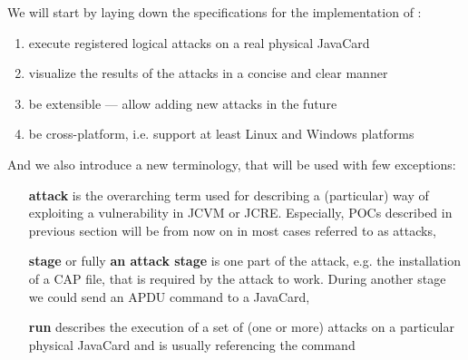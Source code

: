 \documentclass{../llncs/llncs}
\begin{document}
    We will start by laying down the specifications for the implementation of \projectname:
    \begin{enumerate}
        \item execute registered logical attacks on a real physical JavaCard %
        \item visualize the results of the attacks in a concise and clear manner %
        \item be extensible --- allow adding new attacks in the future %
        \item be cross-platform, i.e. support at least Linux and Windows platforms %
    \end{enumerate}


    And we also introduce a new terminology, that will be used with few exceptions:

                \begin{enumerate}
                    \item[\textbf{attack}] is the overarching term used for describing a (particular) way of exploiting a vulnerability in JCVM or JCRE\@. Especially, POCs described in previous section will be from now on in most cases referred to as attacks,
                    \item[\textbf{stage}] or fully \textbf{an attack stage} is one part of the attack, e.g. the installation of a CAP file, that is required by the attack to work. During another stage we could send an APDU command to a JavaCard,
                    \item[\textbf{run}] describes the execution of a set  of (one or more) attacks on a particular physical JavaCard and is usually referencing the \javusrun command
                \end{enumerate}
\end{document}
